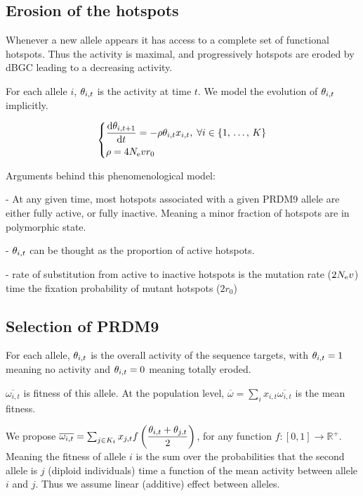\documentclass{article}
\begin{document}
\subsection*{Erosion of the hotspots}

Whenever a new allele appears it has access to a complete set of functional hotspots. Thus the activity is maximal, and progressively hotspots are eroded by dBGC leading to a decreasing activity. 

For each allele $i$,  $\theta _{i,t}$ is the activity at time $t$. We model the evolution of $\theta _{i,t}$ implicitly.

\begin{equation}
\left\{
      \begin{aligned}
 & \dfrac{\mathrm{d} \theta _{i,t+1} }{\mathrm{d} t} =  - \rho \theta _{i,t} x_{i,t}, \;
 \forall i \in \{ 1, \, \dots, \, K \} \\
 & \rho = 4 N_\mathrm{e} v r _0
      \end{aligned}
\right. 
\end{equation}


Arguments behind this phenomenological model: 

- At any given time, most hotspots associated with a given PRDM9 allele are either fully active, or fully inactive. Meaning a minor fraction of hotspots are in polymorphic state.

- $\theta _{i,t}$ can be thought as the proportion of active hotspots.

- rate of substitution from active to inactive hotspots is the mutation rate ($2 N_\mathrm{e} v$) time the fixation probability of mutant hotspots ($2 r_0$)

\subsection*{Selection of PRDM9}

For each allele, $\theta _{i,t}$ is the overall activity of the sequence targets, with $\theta _{i,t}=1$ meaning no activity and $\theta _{i,t}=0$ meaning totally eroded.

$\overline{\omega_{i,t}}$ is fitness of this allele. At the population level, $\overline{\omega}=\sum_{i} x_{i,t} \overline{\omega_{i,t}}$ is the mean fitness.

We propose $\overline{\omega_{i,t}}=\sum_{j \in K_{t}} x_{j,t} f \left( \dfrac{\theta _{i,t} + \theta _{j,t}}{2} \right)$, for any function $f\colon [0,1] \rightarrow \mathbb{R}^+$. Meaning the fitness of allele $i$ is the sum over the probabilities that the second allele is $j$ (diploid individuals) time a function of the mean activity between allele $i$ and $j$. Thus we assume linear (additive) effect between alleles.
\end{document}
